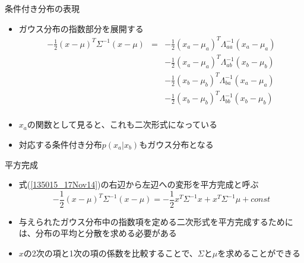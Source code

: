 \begin{frame}{条件付き分布の表現}
 \begin{itemize}
  \item ガウス分布の指数部分を展開する
        \begin{eqnarray}
         -\frac{1}{2}(x - \mu)^{T}\Sigma^{-1}(x-\mu) &= &
          -\frac{1}{2}(x_a - \mu_a)^{T}\Lambda_{aa}^{-1}(x_a-\mu_a) \nonumber \\
         &&-\frac{1}{2}(x_a - \mu_a)^{T}\Lambda_{ab}^{-1}(x_b-\mu_b) \nonumber \\
         &&-\frac{1}{2}(x_b - \mu_b)^{T}\Lambda_{ba}^{-1}(x_a-\mu_a) \nonumber \\
         &&-\frac{1}{2}(x_b - \mu_b)^{T}\Lambda_{bb}^{-1}(x_b-\mu_b) \nonumber \\
         &&\label{003314_21Nov14}
        \end{eqnarray}
  \item $x_a$の関数として見ると、これも\alert{二次形式}になっている
  \item 対応する条件付き分布$p(x_a | x_b)$もガウス分布となる
 \end{itemize}
\end{frame}

\begin{frame}{平方完成}
 \begin{itemize}
  \item 式(\ref{135015_17Nov14})の右辺から左辺への変形を\alert{平方完成}と呼ぶ
        \begin{equation}
         -\frac{1}{2}(x-\mu)^{T}\Sigma^{-1}(x-\mu) = -\frac{1}{2}x^T\Sigma^{-1}x+x^T\Sigma^{-1}\mu + const\label{135015_17Nov14}
        \end{equation}
  \item 与えられたガウス分布中の指数項を定める二次形式を平方完成するためには、分布の平均と分散を求める必要がある
  \item $x$の2次の項と1次の項の係数を比較することで、$\Sigma$と$\mu$を求めることができる
 \end{itemize}
\end{frame}

